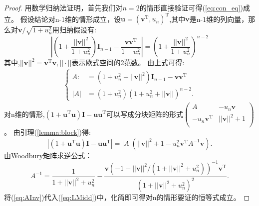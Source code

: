 \begin{proof}
用数学归纳法证明，首先我们对$n=2$的情形直接验证可得(\ref{eq:con_eq})成立。
假设结论对n-1维的情形成立，设$\bm{u}=(\bm{v}^{\textrm{T}} ,u_n)^{\textrm{T}} $,其中$\bm{v}$是n-1维的列向量，那么对$\bm{v}/\sqrt{1+u_n^2}$用归纳假设有:
\begin{equation}
|(1+\frac{||\bm{v}||^2}{1+u_n^2})\bm{I}_{n-1}-\frac{\bm{v}\bm{v}^{\textrm{T}} }{1+u_n^2}|=(1+\frac{||\bm{v}||^2}{1+u_n^2})^{n-2}
\end{equation}
其中,$||\bm{v}||^2=\bm{v}^{\textrm{T}} \bm{v},||\cdot||$表示欧式空间的2范数。
由上式可得:
\begin{align*}
\begin{cases}
A:&=(1+u_n^2+||\bm{v}||^2)\bm{I}_{n-1}-\bm{v}\bm{v}^{\textrm{T}}\\
|A|&=(1+u_n^2)(1+u_n^2+||\bm{v}||)^{n-2}.
\end{cases}
\end{align*}
对n维的情形,$(1+\bm{u}^{\textrm{T}} \bm{u})\bm{I}-\bm{u}\bm{u}^{\textrm{T}} $可以写成分块矩阵的形式$\left(\begin{array}{cc}
A&-u_n\bm{v}\\
-u_n\bm{v}^{\textrm{T}} &||\bm{v}||^2+1\\
\end{array}\right)$。
由引理(\ref{lemma:block})得:
\begin{equation}\label{eq:LMidd}
|(1+\bm{u}^{\textrm{T}} \bm{u})\bm{I}-\bm{u}\bm{u}^{\textrm{T}} |=|A|(||\bm{v}||^2+1-u_n^2 \bm{v}^{\textrm{T}} A^{-1}\bm{v}).
\end{equation}
由Woodbury矩阵求逆公式：
\begin{equation}\label{eq:AInv}
A^{-1}=\frac{1}{1+||\bm{v}||^2+u_n^2}-\frac{\bm{v}(-1+||\bm{v}||^2/(1+||\bm{v}||^2+u_n^2))^{-1}\bm{v}^{\textrm{T}} }{(1+||\bm{v}||^2+u_n^2)^2}.
\end{equation}
将(\ref{eq:AInv})代入(\ref{eq:LMidd})中，化简即可得对n的情形要证的恒等式成立。
\end{proof}

